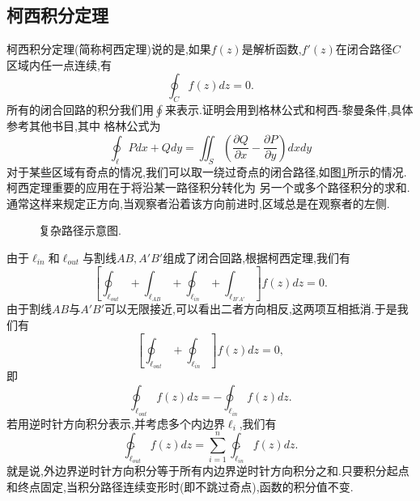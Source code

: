 \subsection{柯西积分定理}
\label{subsec:cauchy_theorem}
柯西积分定理(简称柯西定理)说的是,如果$f(z)$是解析函数,$f'(z)$在闭合路径$C$%
区域内任一点连续,有
\begin{equation}
    \oint_C f(z) dz = 0.
\end{equation}
所有的闭合回路的积分我们用$\oint$来表示.证明会用到格林公式和柯西-黎曼条件,具体参考其他书目,其中
格林公式为
\begin{equation}
    \oint_\ell P dx + Q dy = \iint_S \left( \frac{\partial Q}{\partial x} - \frac{\partial P}{\partial y}  \right) dx dy
\end{equation}
对于某些区域有奇点的情况,我们可以取一绕过奇点的闭合路径,如图\ref{fig:complexregion}所示的情况.柯西定理重要的应用在于将沿某一路径积分转化为
另一个或多个路径积分的求和.通常这样来规定正方向,当观察者沿着该方向前进时,区域总是在观察者的左侧.
\begin{figure}
    \centering
    
    \caption{复杂路径示意图.}
    \label{fig:complexregion}
\end{figure}
由于$\ell_{in}$和$\ell_{out}$与割线$AB,A'B'$组成了闭合回路,根据柯西定理,我们有
\[
    \left[ \oint _{\ell_{out}} + \int _{\ell_{AB}} + \oint _{\ell_{in}} + \int _{\ell_{B'A'}} \right] f(z) dz = 0 .
\]   
由于割线$AB$与$A'B'$可以无限接近,可以看出二者方向相反,这两项互相抵消.于是我们有
\[
    \left[ \oint _{\ell_{out}} + \oint _{\ell_{in}}  \right] f(z) dz = 0,
\]
即
\[
    \oint_{\ell_{out}} f(z) dz = - \oint _{\ell_{in}}f(z) dz .
\]
若用逆时针方向积分表示,并考虑多个内边界$\ell_{i}$,我们有
\begin{equation}
    \ointctrclockwise_{\ell_{out}} f(z) dz = \sum_{i=1}^{n} \ointctrclockwise_{\ell_{in}} f(z) dz .
\end{equation}
就是说,外边界逆时针方向积分等于所有内边界逆时针方向积分之和.只要积分起点和终点固定,当积分路径连续变形时(即不跳过奇点),函数的积分值不变.

